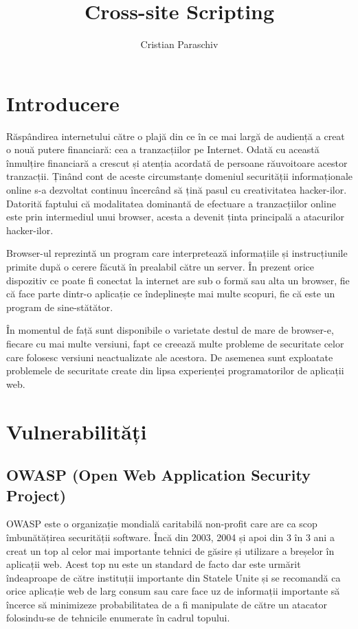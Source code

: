 \documentclass[12pt,a4paper,draft]{article}
\author{Cristian Paraschiv}
\title{Cross-site Scripting}
\begin{document}
	\section{Introducere}
	Răspândirea internetului către o plajă din ce în ce mai largă de audien\-ță a creat o nouă putere financiară: cea a tranzacțiilor pe Internet. Odată cu această înmulțire financiară a crescut și atenția acordată de persoane răuvoitoare acestor tranzacții. Ținând cont de aceste circumstanțe domeniul securității informaționale online s-a dezvoltat continuu încercând să țină pasul cu creativitatea hacker-ilor. Datorită faptului că modalitatea dominantă de efectuare a tranzacțiilor online este prin intermediul unui browser, acesta a devenit ținta principală a atacurilor hacker-ilor.
	
	Browser-ul reprezintă un program care interpretează informațiile și in\-strucțiunile primite după o cerere făcută în prealabil către un server. În prezent orice dispozitiv ce poate fi conectat la internet are sub o formă sau alta un browser, fie că face parte dintr-o aplicație ce îndeplinește mai multe scopuri, fie că este un program de sine-stătător.
	
	În momentul de față sunt disponibile o varietate destul de mare de \linebreak browser-e, fiecare cu mai multe versiuni, fapt ce creează multe probleme de securitate celor care folosesc versiuni neactualizate ale acestora. De asemenea sunt exploatate problemele de securitate create din lipsa experienței  programatorilor de aplicații web.
	
	\section{Vulnerabilități}
		\subsection{OWASP (Open Web Application Security Project)}
		OWASP este o organizație mondială caritabilă non-profit care are ca scop îmbunătățirea securității software. Încă din 2003, 2004 și apoi din 3 în 3 ani a creat un top al celor mai importante tehnici de găsire și utilizare a breșelor în aplicații web. Acest top nu este un standard de facto dar este urmărit îndeaproape de către instituții importante din Statele Unite și se recomandă ca orice aplicație web de larg consum sau care face uz de informații importante să încerce să minimizeze probabilitatea de a fi manipulate de către un atacator folosindu-se de tehnicile enumerate în cadrul topului.
\end{document}
